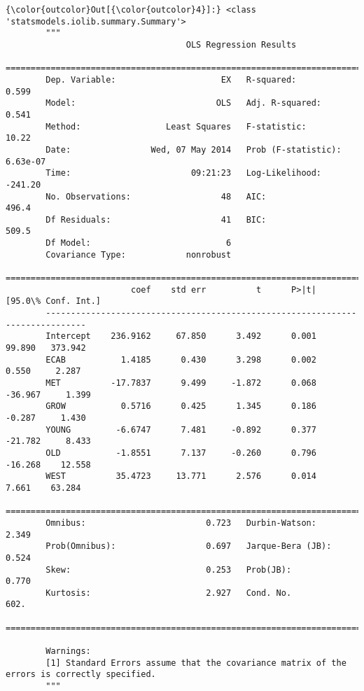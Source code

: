 \documentclass{article}
\begin{document}
            \begin{Verbatim}[commandchars=\\\{\}]
{\color{outcolor}Out[{\color{outcolor}4}]:} <class 'statsmodels.iolib.summary.Summary'>
        """
                                    OLS Regression Results                            
        ==============================================================================
        Dep. Variable:                     EX   R-squared:                       0.599
        Model:                            OLS   Adj. R-squared:                  0.541
        Method:                 Least Squares   F-statistic:                     10.22
        Date:                Wed, 07 May 2014   Prob (F-statistic):           6.63e-07
        Time:                        09:21:23   Log-Likelihood:                -241.20
        No. Observations:                  48   AIC:                             496.4
        Df Residuals:                      41   BIC:                             509.5
        Df Model:                           6                                         
        Covariance Type:            nonrobust                                         
        ==============================================================================
                         coef    std err          t      P>|t|      [95.0\% Conf. Int.]
        ------------------------------------------------------------------------------
        Intercept    236.9162     67.850      3.492      0.001        99.890   373.942
        ECAB           1.4185      0.430      3.298      0.002         0.550     2.287
        MET          -17.7837      9.499     -1.872      0.068       -36.967     1.399
        GROW           0.5716      0.425      1.345      0.186        -0.287     1.430
        YOUNG         -6.6747      7.481     -0.892      0.377       -21.782     8.433
        OLD           -1.8551      7.137     -0.260      0.796       -16.268    12.558
        WEST          35.4723     13.771      2.576      0.014         7.661    63.284
        ==============================================================================
        Omnibus:                        0.723   Durbin-Watson:                   2.349
        Prob(Omnibus):                  0.697   Jarque-Bera (JB):                0.524
        Skew:                           0.253   Prob(JB):                        0.770
        Kurtosis:                       2.927   Cond. No.                         602.
        ==============================================================================
        
        Warnings:
        [1] Standard Errors assume that the covariance matrix of the errors is correctly specified.
        """
\end{Verbatim}
        
\end{document}
